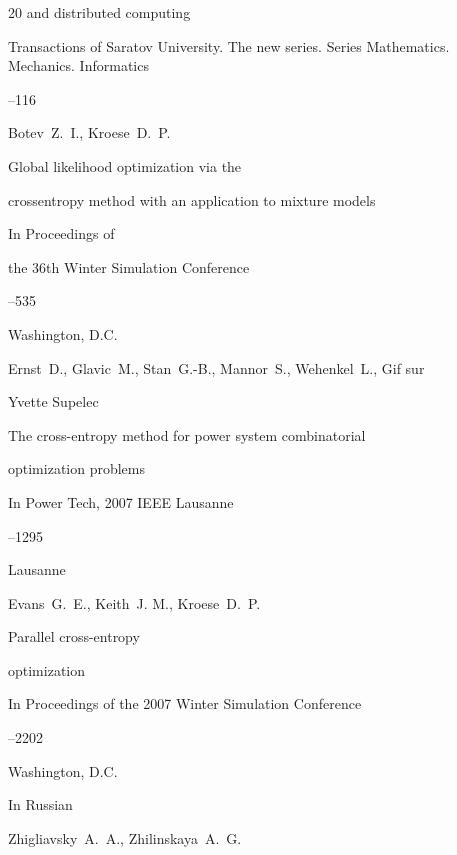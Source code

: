 \begin{thebibliography}{20}
and distributed computing

\jour Transactions of Saratov University. The new series. Series Mathematics. Mechanics. Informatics




--116




\by  Botev~Z.~I.,  Kroese~D.~P.

\paper Global likelihood optimization via the

crossentropy method with an application to mixture models

\inbook In Proceedings of

the 36th Winter Simulation Conference

--535

\publaddr Washington, D.C.





\by Ernst~D., Glavic~M., Stan~G.-B.,  Mannor~S.,  Wehenkel~L., Gif sur

Yvette Supelec

\paper  The cross-entropy method for power system combinatorial

optimization problems

\inbook In Power Tech, 2007 IEEE Lausanne

--1295

\publaddr Lausanne





\by Evans~G.~E., Keith~J. M., Kroese~D.~P.

\paper Parallel cross-entropy

optimization

\inbook In Proceedings of the 2007 Winter Simulation Conference

--2202

\publaddr Washington, D.C.





\lang In Russian

\by Zhigliavsky~A.~A., Zhilinskaya~A.~G.


\end{thebibliography}
